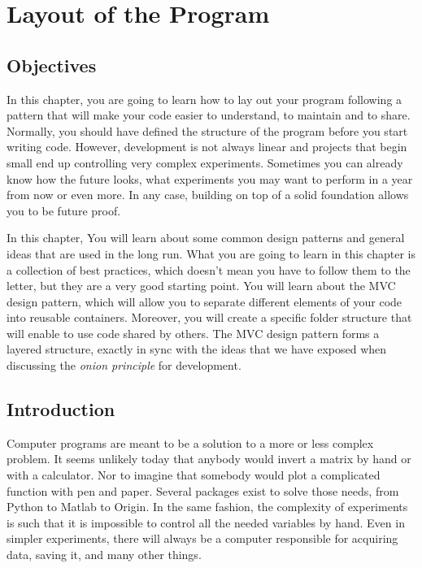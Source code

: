 \chapter{Layout of the Program}\label{layout-of-theprogram}

\section{Objectives}
In this chapter, you are going to learn how to lay out your program
following a pattern that will make your code easier to understand, to
maintain and to share. Normally, you should have defined the structure
of the program before you start writing code. However, development is
not always linear and projects that begin small end up controlling very
complex experiments. Sometimes you can already know how the future
looks, what experiments you may want to perform in a year from now or
even more. In any case, building on top of a solid foundation allows you
to be future proof.

In this chapter, You will learn about some common design patterns and
general ideas that are used in the long run. What you are going to learn
in this chapter is a collection of best practices, which doesn't mean
you have to follow them to the letter, but they are a very good starting
point. You will learn about the {MVC} design pattern, which will allow
you to separate different elements of your code into reusable
containers. Moreover, you will create a specific folder structure that
will enable to use code shared by others. The {MVC} design pattern forms
a layered structure, exactly in sync with the ideas that we have exposed
when discussing the \emph{onion principle} for development.

\section{Introduction}
Computer programs are meant to be a solution to a more or less complex
problem. It seems unlikely today that anybody would invert a matrix by
hand or with a calculator. Nor to imagine that somebody would plot a
complicated function with pen and paper. Several packages exist to solve
those needs, from Python to Matlab to Origin. In the same fashion, the
complexity of experiments is such that it is impossible to control all
the needed variables by hand. Even in simpler experiments, there will
always be a computer responsible for acquiring data, saving it, and many
other things.

